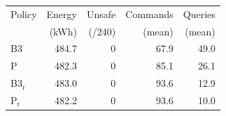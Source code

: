\begin{tabular}{lrrrr}
\hline
Policy & Energy & Unsafe & Commands & Queries \\
 & (kWh) & (/240) & (mean) & (mean) \\
\hline
B3 & 484.7 & 0 & 67.9 & 49.0 \\
P & 482.3 & 0 & 85.1 & 26.1 \\
B3$_{\mathrm{r}}$ & 483.0 & 0 & 93.6 & 12.9 \\
P$_{\mathrm{r}}$ & 482.2 & 0 & 93.6 & 10.0 \\
\hline
\end{tabular}

